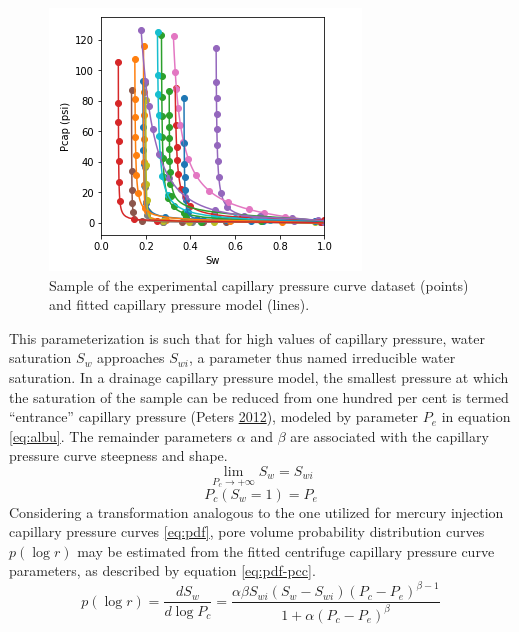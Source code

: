 \documentclass[english,msc,numbers]{coppe}
\begin{document}
  \begin{figure}
  
  {\centering \includegraphics[width=0.7\linewidth]{figure/2-9-pcc-dataset} 
  
  }
  
  \caption{Sample of the experimental capillary pressure curve dataset (points) and fitted capillary pressure model (lines).}\label{fig:pcc-dataset}
  \end{figure}
  This parameterization is such that for high values of capillary pressure, water saturation \(S_w\) approaches \(S_{wi}\), a parameter thus named irreducible water saturation. In a drainage capillary pressure model, the smallest pressure at which the saturation of the sample can be reduced from one hundred per cent is termed ``entrance'' capillary pressure (Peters \protect\hyperlink{ref-Peters2012}{2012}), modeled by parameter \(P_e\) in equation \eqref{eq:albu}. The remainder parameters \(\alpha\) and \(\beta\) are associated with the capillary pressure curve steepness and shape.
  \begin{equation} 
    \lim_{P_c \to +\infty} S_w = S_{wi}
    \label{eq:lim-swi}
  \end{equation}
  \begin{equation} 
    P_c(S_{w}=1) = P_e
    \label{eq:lim-pe}
  \end{equation}
  Considering a transformation analogous to the one utilized for mercury injection capillary pressure curves \eqref{eq:pdf}, pore volume probability distribution curves \(p(\log r)\) may be estimated from the fitted centrifuge capillary pressure curve parameters, as described by equation \eqref{eq:pdf-pcc}.
  \begin{equation} 
    p(\log r) = \frac{dS_w}{d \log{P_c}} = \frac{\alpha \beta S_{wi} (S_w - S_{wi})(P_c - P_e)^{\beta - 1}}{1 + \alpha (P_c - P_e)^\beta}
    \label{eq:pdf-pcc}
  \end{equation}
\end{document}
